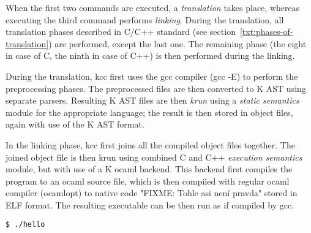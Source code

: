 \documentclass{fithesis3}
\begin{document}
When the first two commands are executed, a \textit{translation} takes place, whereas executing the third command performs \textit{linking}. During the translation, all translation phases described in C/C++ standard (see section~\ref{txt:phases-of-translation}) are performed, except the last one. The remaining phase (the eight in case of C, the ninth in case of C++) is then performed during the linking.

During the translation, kcc first uses the gcc compiler (gcc -E) to perform the preprocessing phases. The preprocessed files are then converted to K AST using separate parsers. Resulting K AST files are then \textit{krun} using a \textit{static semantics} module for the appropriate language; the result is then stored in object files, again with use of the K AST format.

In the linking phase, kcc first joins all the compiled object files together. The joined object file is then krun using combined C and C++ \textit{execution semantics} module, but with use of a K ocaml backend. This backend first compiles the program to an ocaml source file, which is then compiled with regular ocaml compiler (ocamlopt) to native code "FIXME: Tohle asi není pravda" stored in ELF format. The resulting executable can be then run as if compiled by gcc.

\begin{lstlisting}[language=bash]
$ ./hello
\end{lstlisting}




\end{document}
